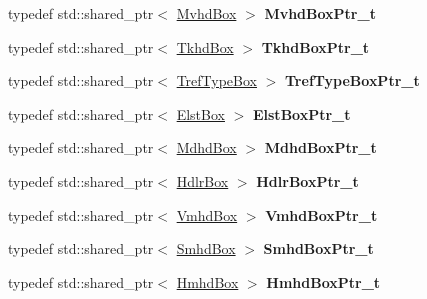 \begin{DoxyCompactItemize}
typedef std\+::shared\+\_\+ptr$<$ \mbox{\hyperlink{classmp4_parser_1_1_mvhd_box}{Mvhd\+Box}} $>$ {\bfseries Mvhd\+Box\+Ptr\+\_\+t}
\item 
\mbox{\label{namespacemp4_parser_aa365c2d8630931f6ea70ee018a67d8c9}} 
typedef std\+::shared\+\_\+ptr$<$ \mbox{\hyperlink{classmp4_parser_1_1_tkhd_box}{Tkhd\+Box}} $>$ {\bfseries Tkhd\+Box\+Ptr\+\_\+t}
\item 
\mbox{\label{namespacemp4_parser_ac072a06018504be19420629f8f0cf055}} 
typedef std\+::shared\+\_\+ptr$<$ \mbox{\hyperlink{classmp4_parser_1_1_tref_type_box}{Tref\+Type\+Box}} $>$ {\bfseries Tref\+Type\+Box\+Ptr\+\_\+t}
\item 
\mbox{\label{namespacemp4_parser_a5a6b6f3a1a5b3c5b9fba2f088d9c9a6d}} 
typedef std\+::shared\+\_\+ptr$<$ \mbox{\hyperlink{classmp4_parser_1_1_elst_box}{Elst\+Box}} $>$ {\bfseries Elst\+Box\+Ptr\+\_\+t}
\item 
\mbox{\label{namespacemp4_parser_a0dbae09a4405c1d1a980cf50ccbb88e5}} 
typedef std\+::shared\+\_\+ptr$<$ \mbox{\hyperlink{classmp4_parser_1_1_mdhd_box}{Mdhd\+Box}} $>$ {\bfseries Mdhd\+Box\+Ptr\+\_\+t}
\item 
\mbox{\label{namespacemp4_parser_a64824858d0d30de1e1ad7468464e30d9}} 
typedef std\+::shared\+\_\+ptr$<$ \mbox{\hyperlink{classmp4_parser_1_1_hdlr_box}{Hdlr\+Box}} $>$ {\bfseries Hdlr\+Box\+Ptr\+\_\+t}
\item 
\mbox{\label{namespacemp4_parser_a29045c6c94c4443fa396691d5ce6c464}} 
typedef std\+::shared\+\_\+ptr$<$ \mbox{\hyperlink{classmp4_parser_1_1_vmhd_box}{Vmhd\+Box}} $>$ {\bfseries Vmhd\+Box\+Ptr\+\_\+t}
\item 
\mbox{\label{namespacemp4_parser_acab13dd9f957464ea07bff2dd34fed28}} 
typedef std\+::shared\+\_\+ptr$<$ \mbox{\hyperlink{classmp4_parser_1_1_smhd_box}{Smhd\+Box}} $>$ {\bfseries Smhd\+Box\+Ptr\+\_\+t}
\item 
\mbox{\label{namespacemp4_parser_ab5bb32acfaa7be14b2e006584ec554bf}} 
typedef std\+::shared\+\_\+ptr$<$ \mbox{\hyperlink{classmp4_parser_1_1_hmhd_box}{Hmhd\+Box}} $>$ {\bfseries Hmhd\+Box\+Ptr\+\_\+t}

\end{DoxyCompactItemize}

